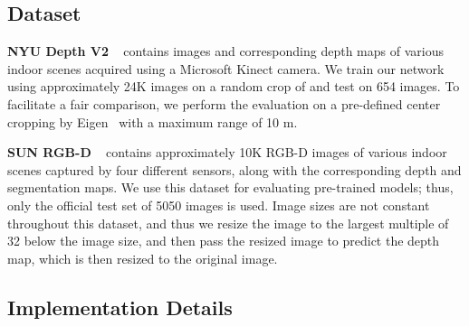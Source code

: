 \documentclass{article}
\makeatletter
\let\@internalcite\cite
\def\cite{\def\citeauthoryear##1##2{##1, ##2}\@internalcite}
\makeatother
\begin{document}
\subsection{Dataset}
\noindent\textbf{NYU Depth V2}
~\cite{silberman2012indoor} contains  images and corresponding depth maps of various indoor scenes acquired using a Microsoft Kinect camera. We train our network using approximately 24K images on a random crop of  and test on 654 images. To facilitate a fair comparison, we perform the evaluation on a pre-defined center cropping by Eigen~\cite{eigen2014depth} with a maximum range of 10 m.

\noindent\textbf{SUN RGB-D}
~\cite{Song2015CVPR} contains approximately 10K RGB-D images of various indoor scenes captured by four different sensors, along with the corresponding depth and segmentation maps. We use this dataset for evaluating pre-trained models; thus, only the official test set of 5050 images is used.
Image sizes are not constant throughout this dataset, and thus we resize the image to the largest multiple of 32 below the image size, and then pass the resized image to predict the depth map, which is then resized to the original image.


\iffalse
\noindent\textbf{iBims-1}
Independent benchmark images and matched scans version 1~\cite{koch2018evaluation} (iBims-1) is a high-quality RGB-D dataset acquired using a digital single-lens reflex (DSLR) camera and high-precision laser scanner. 
It contains 100 images for the test set and is only used to evaluate the methods. 
\fi

\iffalse
\subsection{Evaluation Metrics}
To evaluate the performance of our method, we use standard metrics for depth estimation from prior works. In the following metrics,  and  respectively denotes predicted and ground-truth depth, and  presents a set of all the predicted depth values of an input image.
\begin{itemize}
    \item  : 
    \item Abs Rel : 
    \item Sq Rel : 
    \item RMSE : 
    \item RMSE log : 
\end{itemize}
\fi




\subsection{Implementation Details}
\end{document}
